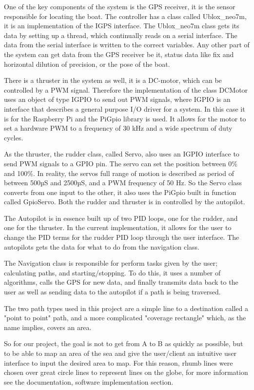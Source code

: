 One of the key components of the system is the GPS receiver, it is the sensor responsible for locating the boat. The controller has a class called Ublox\_neo7m, it is an implementation of the IGPS interface. The Ublox\_neo7m class gets its data by setting up a thread, which continually reads on a serial interface. The data from the serial interface is written to the correct variables. Any other part of the system can get data from the GPS receiver be it, status data like fix and horizontal dilution of precision, or the pose of the boat. 

There is a thruster in the system as well, it is a DC-motor, which can be controlled by a PWM signal. Therefore the implementation of the class DCMotor uses an object of type IGPIO to send out PWM signals, where IGPIO is an interface that describes a general purpose I/O driver for a system. In this case it is for the Raspberry Pi and the PiGpio library is used\cite{pigpio}. It allows for the motor to set a hardware PWM to a frequency of 30 kHz and a wide spectrum of duty cycles.

As the thruster, the rudder class, called Servo, also uses an IGPIO interface to send PWM signals to a GPIO pin. The servo can set the position between 0\% and 100\%. In reality, the servos full range of motion is described as period of between 500µS and 2500µS, and a PWM frequency of 50 Hz. So the Servo class converts from one input to the other, it also uses the PiGpio built in function called GpioServo. Both the rudder and thruster is in controlled by the autopilot.

The Autopilot is in essence built up of two PID loops, one for the rudder, and one for the thruster. In the current implementation, it allows for the user to change the PID terms for the rudder PID loop through the user interface. The autopilots gets the data for what to do from the navigation class.

The Navigation class is responsible for perform tasks given by the user; calculating paths, and starting/stopping. To do this, it uses a number of algorithms, calls the GPS for new data, and finally transmits data back to the user as well as sending data to the autopilot if a path is being traversed.

The two path types used in this project are a simple line to a destination called a "point to point" path, and a more complicated "coverage rectangle" which, as the name implies, covers an area.

So for our project, the goal is not to get from A to B as quickly as possible, but to be able to map an area of the sea and give the user/client an intuitive user interface to input the desired area to map. For this reason, rhumb lines were chosen over great circle lines to represent lines on the globe, for more information see the documentation, software implementation section.

